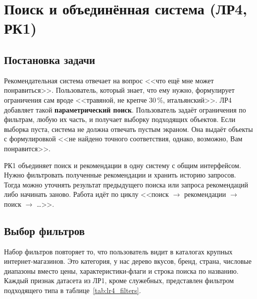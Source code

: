 \chapter{Поиск и объединённая система (ЛР4, РК1)}

\section{Постановка задачи}

Рекомендательная система отвечает на вопрос <<что ещё мне может понравиться>>. Пользователь, который знает, что ему нужно, формулирует ограничения сам вроде <<травяной, не крепче 30\,\%, итальянский>>. ЛР4 добавляет такой \textbf{параметрический поиск}. Пользователь задаёт ограничения по фильтрам, любую их часть, и получает выборку подходящих объектов. Если выборка пуста, система не должна отвечать пустым экраном. Она выдаёт объекты с формулировкой <<не найдено точного соответствия, однако, возможно, Вам понравится>>.

РК1 объединяет поиск и рекомендации в одну систему с общим интерфейсом. Нужно фильтровать полученные рекомендации и хранить историю запросов. Тогда можно уточнять результат предыдущего поиска или запроса рекомендаций либо начинать заново. Работа идёт по циклу <<поиск $\rightarrow$ рекомендации $\rightarrow$ поиск $\rightarrow$ \ldots>>.

\section{Выбор фильтров}

Набор фильтров повторяет то, что пользователь видит в каталогах крупных интернет-магазинов. Это категория, у нас дерево вкусов, бренд, страна, числовые диапазоны вместо цены, характеристики-флаги и строка поиска по названию. Каждый признак датасета из ЛР1, кроме служебных, представлен фильтром подходящего типа в таблице~\ref{tab:lr4_filters}.

